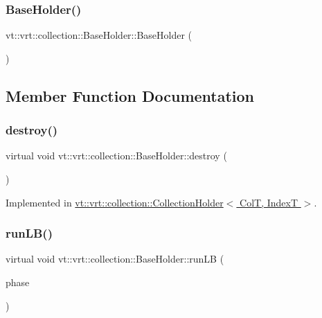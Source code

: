 \subsubsection{\texorpdfstring{Base\+Holder()}{BaseHolder()}}
{\footnotesize\ttfamily vt\+::vrt\+::collection\+::\+Base\+Holder\+::\+Base\+Holder (\begin{DoxyParamCaption}{ }\end{DoxyParamCaption})\hspace{0.3cm}{\ttfamily [default]}}



\subsection{Member Function Documentation}
\mbox{\label{structvt_1_1vrt_1_1collection_1_1_base_holder_a56c8289f60121e38f3699bcfafbbd491}} 
\subsubsection{\texorpdfstring{destroy()}{destroy()}}
{\footnotesize\ttfamily virtual void vt\+::vrt\+::collection\+::\+Base\+Holder\+::destroy (\begin{DoxyParamCaption}{ }\end{DoxyParamCaption})\hspace{0.3cm}{\ttfamily [pure virtual]}}



Implemented in \hyperlink{structvt_1_1vrt_1_1collection_1_1_collection_holder_a744d2a48f9f22db59b2705b3d3f3d1ca}{vt\+::vrt\+::collection\+::\+Collection\+Holder$<$ Col\+T, Index\+T $>$}.

\mbox{\label{structvt_1_1vrt_1_1collection_1_1_base_holder_ab9f7a730ced86b24d75b3f33ea3db3e8}} 
\subsubsection{\texorpdfstring{run\+L\+B()}{runLB()}}
{\footnotesize\ttfamily virtual void vt\+::vrt\+::collection\+::\+Base\+Holder\+::run\+LB (\begin{DoxyParamCaption}\item[{\hyperlink{namespacevt_a46ce6733d5cdbd735d561b7b4029f6d7}{Phase\+Type}}]{phase }\end{DoxyParamCaption})\hspace{0.3cm}{\ttfamily [pure virtual]}}



